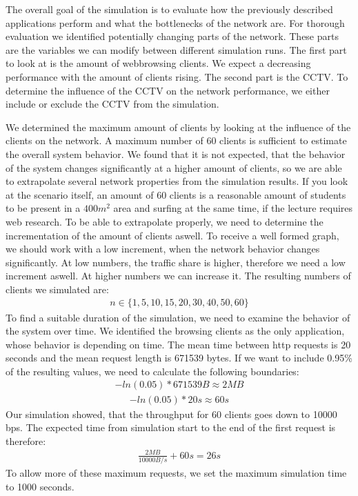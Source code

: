 \documentclass[
10pt, %
a4paper, %
oneside, %
headinclude,footinclude, %
BCOR5mm, %
]{scrartcl}
\begin{document}
The overall goal of the simulation is to evaluate how the previously described applications perform and what the bottlenecks of the network are. For thorough evaluation we identified potentially changing parts of the network. These parts are the variables we can modify between different simulation runs.
The first part to look at is the amount of webbrowsing clients. We expect a decreasing performance with the amount of clients rising.
The second part is the CCTV. To determine the influence of the CCTV on the network performance, we either include or exclude the CCTV from the simulation.

We determined the maximum amount of clients by looking at the influence of the clients on the network. A maximum number of 60 clients is sufficient to estimate the overall system behavior. We found that it is not expected, that the behavior of the system changes significantly at a higher amount of clients, so we are able to extrapolate several network properties from the simulation results. If you look at the scenario itself, an amount of 60 clients is a reasonable amount of students to be present in a $400m^{2}$ area and surfing at the same time, if the lecture requires web research.
To be able to extrapolate properly, we need to determine the incrementation of the amount of clients aswell. To receive a well formed graph, we should work with a low increment, when the network behavior changes significantly. At low numbers, the traffic share is higher, therefore we need a low increment aswell. At higher numbers we can increase it. The resulting numbers of clients we simulated are:
\begin{align*}
n \in \{1,5,10,15,20,30,40,50,60\}
\end{align*}
To find a suitable duration of the simulation, we need to examine the behavior of the system over time. We identified the browsing clients as the only application, whose behavior is depending on time. The mean time between http requests is 20 seconds and the mean request length is 671539 bytes. If we want to include 0.95\% of the resulting values, we need to calculate the following boundaries:
\begin{align*}
-ln(0.05) * 671539 B \approx 2 MB
\end{align*}
\begin{align*}
-ln(0.05) * 20s \approx 60s
\end{align*}
Our simulation showed, that the throughput for 60 clients goes down to 10000 bps. The expected time from simulation start to the end of the first request is therefore: 
\begin{align*}
\frac{2 MB}{10000 B/s} + 60 s = 26 s
\end{align*}
To allow more of these maximum requests, we set the maximum simulation time to 1000 seconds.
\end{document}

